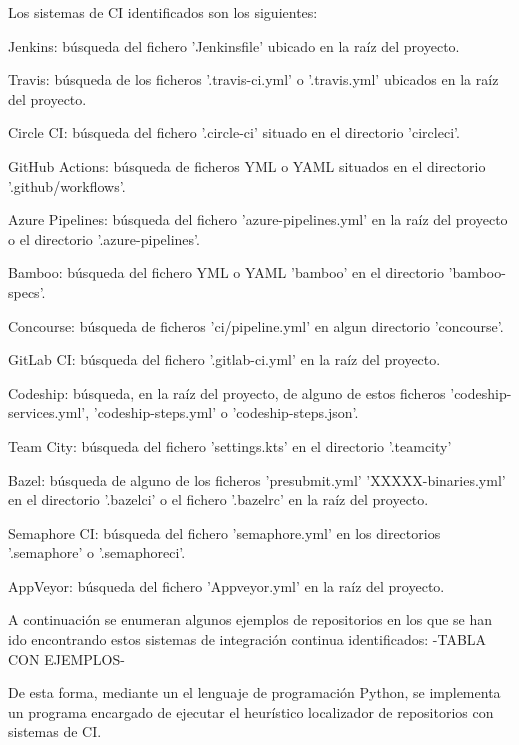 Los sistemas de CI identificados son los siguientes:
\begin{compactitem}
    \item Jenkins: búsqueda del fichero 'Jenkinsfile' ubicado en la raíz del proyecto.
    \item Travis: búsqueda de los ficheros '.travis-ci.yml' o '.travis.yml' ubicados en la raíz del proyecto.
    \item Circle CI: búsqueda del fichero '.circle-ci' situado en el directorio 'circleci'.
    \item GitHub Actions: búsqueda de ficheros YML o YAML situados en el directorio '.github/workflows'.
    \item Azure Pipelines: búsqueda del fichero 'azure-pipelines.yml' en la raíz del proyecto o el directorio '.azure-pipelines'.
    \item Bamboo: búsqueda del fichero YML o YAML 'bamboo' en el directorio 'bamboo-specs'.
    \item Concourse: búsqueda de ficheros 'ci/pipeline.yml' en algun directorio 'concourse'.
    \item GitLab CI: búsqueda del fichero '.gitlab-ci.yml' en la raíz del proyecto.
    \item Codeship: búsqueda, en la raíz del proyecto, de alguno de estos ficheros 'codeship-services.yml', 'codeship-steps.yml' o 'codeship-steps.json'.
    \item Team City: búsqueda del fichero 'settings.kts' en el directorio '.teamcity'
    \item Bazel: búsqueda de alguno de los ficheros 'presubmit.yml' 'XXXXX-binaries.yml' en el directorio '.bazelci' o el fichero '.bazelrc' en la raíz del proyecto.
    \item Semaphore CI: búsqueda del fichero 'semaphore.yml' en los directorios '.semaphore' o '.semaphoreci'.
    \item AppVeyor: búsqueda del fichero 'Appveyor.yml' en la raíz del proyecto.
\end{compactitem}

A continuación se enumeran algunos ejemplos de repositorios en los que se han ido encontrando estos sistemas de integración continua identificados:
-TABLA CON EJEMPLOS-
	
De esta forma, mediante un el lenguaje de programación Python, se implementa un programa encargado de ejecutar el heurístico localizador de repositorios con sistemas de CI.

